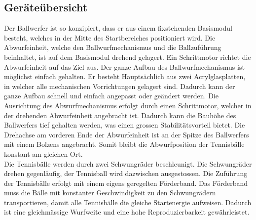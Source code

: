 \subsection{Geräteübersicht}
Der Ballwerfer ist so konzipiert, dass er aus einem fixstehenden Basismodul besteht, welches in der Mitte des Startbereiches positioniert wird. Die Abwurfeinheit, welche den Ballwurfmechanismus und die Ballzuführung beinhaltet, ist auf dem Basismodul drehend gelagert. Ein Schrittmotor richtet die Abwurfeinheit auf das Ziel aus. Der ganze Aufbau des Ballwurfmechanismus ist möglichst einfach gehalten. Er besteht Hauptsächlich aus zwei Acrylglasplatten, in welcher alle mechanischen Vorrichtungen gelagert sind. Dadurch kann der ganze Aufbau schnell und einfach angepasst oder geändert werden. Die Ausrichtung des Abwurfmechanismus erfolgt durch einen Schrittmotor, welcher in der drehenden Abwurfeinheit angebracht ist. Dadurch kann die Bauhöhe des Ballwerfers tief gehalten werden, was einen grossen Stabilitätsvorteil bietet. Die Drehachse am vorderen Ende der Abwurfeinheit ist an der Spitze des Ballwerfers mit einem Bolzens angebracht. Somit bleibt die Abwurfposition der Tennisbälle konstant am gleichen Ort.\\
Die Tennisbälle werden durch zwei Schwungräder beschleunigt. Die Schwungräder drehen gegenläufig, der Tennisball wird dazwischen ausgestossen. Die Zuführung der Tennisbälle erfolgt mit einem eigens geregelten Förderband. Das Förderband muss die Bälle mit konstanter Geschwindigkeit zu den Schwungrädern transportieren, damit alle Tennisbälle die gleiche Startenergie aufweisen. Dadurch ist eine gleichmässige Wurfweite und eine hohe Reproduzierbarkeit gewährleistet. \\
